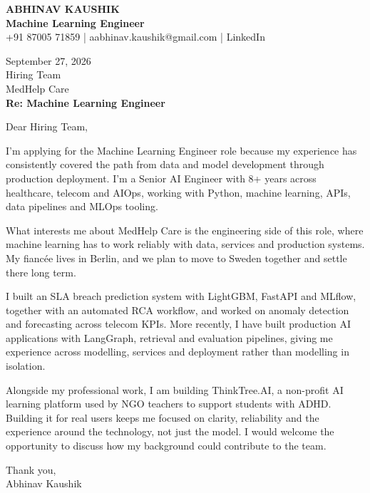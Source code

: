 \documentclass[10pt,a4paper]{article}
\begin{document}
\begin{center}
{\Large\bfseries ABHINAV KAUSHIK}\\[2pt]
{\bfseries Machine Learning Engineer}\\[2pt]
+91 87005 71859 \quad | \quad aabhinav.kaushik@gmail.com \quad | \quad LinkedIn
\end{center}
\vspace{8pt}
September 27, 2026\\[6pt]
Hiring Team\\
MedHelp Care\\[4pt]
\textbf{Re: Machine Learning Engineer}

Dear Hiring Team,

I’m applying for the Machine Learning Engineer role because my experience has consistently covered the path from data and model development through production deployment. I’m a Senior AI Engineer with 8+ years across healthcare, telecom and AIOps, working with Python, machine learning, APIs, data pipelines and MLOps tooling.

What interests me about MedHelp Care is the engineering side of this role, where machine learning has to work reliably with data, services and production systems. My fiancée lives in Berlin, and we plan to move to Sweden together and settle there long term.

I built an SLA breach prediction system with LightGBM, FastAPI and MLflow, together with an automated RCA workflow, and worked on anomaly detection and forecasting across telecom KPIs. More recently, I have built production AI applications with LangGraph, retrieval and evaluation pipelines, giving me experience across modelling, services and deployment rather than modelling in isolation.

Alongside my professional work, I am building ThinkTree.AI, a non-profit AI learning platform used by NGO teachers to support students with ADHD. Building it for real users keeps me focused on clarity, reliability and the experience around the technology, not just the model. I would welcome the opportunity to discuss how my background could contribute to the team.

Thank you,\\
Abhinav Kaushik
\end{document}
